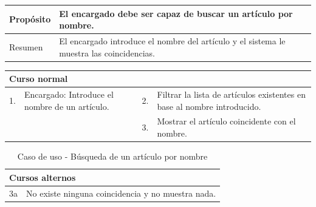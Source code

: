 \begin{table}[H]
	\centering
	\begin{tabular}{| m{} | m{} | m{} | m{} |}
		\hline
		Propósito & \multicolumn{3}{m{0.67\textwidth}|}{El encargado debe ser capaz de buscar un artículo por nombre.}   \\ 
		\hline
		Resumen & \multicolumn{3}{m{0.67\textwidth}|}{El encargado introduce el nombre del artículo y el sistema le muestra las coincidencias.} \\ 
		\hline
	\end{tabular}
\end{table}


\begin{table}[H]
	\centering
	\begin{tabular}{| m{} | m{} | m{} | m{} |}
		\hline
		\multicolumn{4}{|m{0.9\textwidth}|}{Curso normal}     \\ 
		\hline
		1. & Encargado: Introduce el nombre de un artículo. & 2. &  Filtrar la lista de artículos existentes en base al nombre introducido.  \\ 
		\hline
		&  & 3. & Mostrar el artículo coincidente con el nombre.  \\ 
		\hline
	\end{tabular}
\end{table}

\begin{table}[H]
	\centering
	\begin{tabular}{| m{} | m{} | m{} | m{} |}
		\hline
		\multicolumn{4}{|m{0.9\textwidth}|}{Cursos alternos}     \\ 
		\hline
		3a & \multicolumn{3}{m{0.67\textwidth}|}{No existe ninguna coincidencia y no muestra nada.} \\ 
		\hline
	\end{tabular}
	\caption{Caso de uso - Búsqueda de un artículo por nombre }
\end{table}

\newpage


